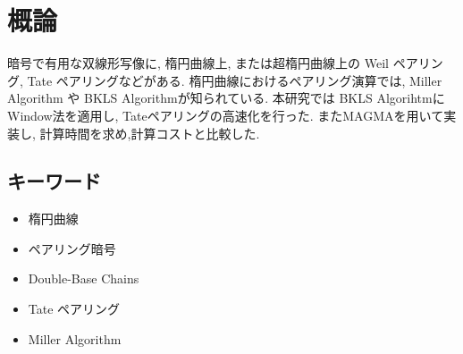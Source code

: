 \chapter*{概論}
暗号で有用な双線形写像に, 楕円曲線上, または超楕円曲線上の Weil ペアリング, Tate ペアリングなどがある. 楕円曲線におけるペアリング演算では, Miller Algorithm や BKLS Algorithmが知られている. 本研究では BKLS AlgorihtmにWindow法を適用し, Tateペアリングの高速化を行った. またMAGMAを用いて実装し, 計算時間を求め,計算コストと比較した.

\bigskip

\section*{キーワード}
\begin{itemize}
\item 楕円曲線
\item ペアリング暗号
\item Double-Base Chains
\item Tate  ペアリング
\item Miller Algorithm
\end{itemize}
